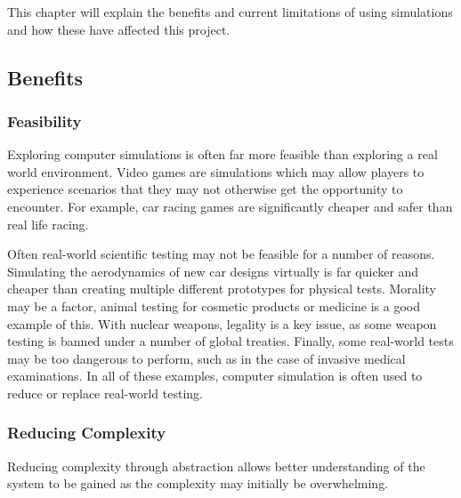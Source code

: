\documentclass{UoYCSproject}
\begin{document}

This chapter will explain the benefits and current limitations of using simulations and how these have affected this project.

\subsection{Benefits}
\subsubsection{Feasibility}
Exploring computer simulations is often far more feasible than exploring a real world environment. Video games are simulations which may allow players to experience scenarios that they may not otherwise get the opportunity to encounter. For example, car racing games are significantly cheaper and safer than real life racing.

Often real-world scientific testing may not be feasible for a number of reasons. Simulating the aerodynamics of new car designs virtually is far quicker and cheaper than creating multiple different prototypes for physical tests. Morality may be a factor, animal testing for cosmetic products or medicine is a good example of this. With nuclear weapons, legality is a key issue, as some weapon testing is banned under a number of global treaties\cite{partial_nuclear_test_ban_treaty, threshold_test_ban_treaty}. Finally, some real-world tests may be too dangerous to perform, such as in the case of invasive medical examinations. %
In all of these examples, computer simulation is often used to reduce or replace real-world testing.


\subsubsection{Reducing Complexity}
Reducing complexity through abstraction allows better understanding of the system to be gained as the complexity may initially be overwhelming.
\end{document}
